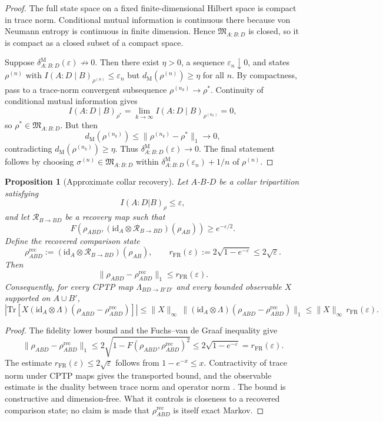 \documentclass[11pt]{article}
\newtheorem{proposition}[theorem]{Proposition}
\begin{document}
\begin{proof}
The full state space on a fixed finite-dimensional Hilbert space is compact in trace norm. Conditional mutual information is continuous there because von Neumann entropy is continuous in finite dimension. Hence \(\mathfrak M_{A:B:D}\) is closed, so it is compact as a closed subset of a compact space.

Suppose \(\delta^{\mathrm M}_{A:B:D}(\varepsilon)\not\to 0\). Then there exist \(\eta>0\), a sequence \(\varepsilon_n\downarrow 0\), and states \(\rho^{(n)}\) with \(I(A:D\mid B)_{\rho^{(n)}}\le \varepsilon_n\) but \(d_{\mathrm M}(\rho^{(n)})\ge \eta\) for all \(n\). By compactness, pass to a trace-norm convergent subsequence \(\rho^{(n_k)}\to \rho^\ast\). Continuity of conditional mutual information gives
\[
I(A:D\mid B)_{\rho^\ast}
=
\lim_{k\to\infty} I(A:D\mid B)_{\rho^{(n_k)}}
=
0,
\]
so \(\rho^\ast\in \mathfrak M_{A:B:D}\). But then
\[
d_{\mathrm M}(\rho^{(n_k)})
\le
\|\rho^{(n_k)}-\rho^\ast\|_1
\longrightarrow 0,
\]
contradicting \(d_{\mathrm M}(\rho^{(n_k)})\ge \eta\). Thus \(\delta^{\mathrm M}_{A:B:D}(\varepsilon)\to 0\). The final statement follows by choosing \(\sigma^{(n)}\in\mathfrak M_{A:B:D}\) within \(\delta^{\mathrm M}_{A:B:D}(\varepsilon_n)+1/n\) of \(\rho^{(n)}\).
\end{proof}

\begin{proposition}[Approximate collar recovery]\label{prop:approxrecover}
Let \(A\)-\(B\)-\(D\) be a collar tripartition satisfying
\[
I(A:D|B)_\rho\le \varepsilon,
\]
and let $\mathcal R_{B\to BD}$ be a recovery map such that
\[
F\!\left(\rho_{ABD},(\mathrm{id}_A\otimes \mathcal R_{B\to BD})(\rho_{AB})\right)\ge e^{-\varepsilon/2}.
\]
Define the recovered comparison state
\[
\rho^{\mathrm{rec}}_{ABD}:=(\mathrm{id}_A\otimes \mathcal R_{B\to BD})(\rho_{AB}),
\qquad
r_{\mathrm{FR}}(\varepsilon):=2\sqrt{1-e^{-\varepsilon}}\le 2\sqrt{\varepsilon}.
\]
Then
\[
\|\rho_{ABD}-\rho^{\mathrm{rec}}_{ABD}\|_1\le r_{\mathrm{FR}}(\varepsilon).
\]
Consequently, for every CPTP map \(\Lambda_{BD\to B'D'}\) and every bounded observable \(X\) supported on \(A\cup B'\),
\[
\left|\mathrm{Tr}\!\left[X(\mathrm{id}_A\otimes \Lambda)(\rho_{ABD}-\rho^{\mathrm{rec}}_{ABD})\right]\right|
\le
\|X\|_\infty\,\|(\mathrm{id}_A\otimes \Lambda)(\rho_{ABD}-\rho^{\mathrm{rec}}_{ABD})\|_1
\le
\|X\|_\infty\,r_{\mathrm{FR}}(\varepsilon).
\]
\end{proposition}

\begin{proof}
The fidelity lower bound and the Fuchs--van de Graaf inequality give
\[
\|\rho_{ABD}-\rho^{\mathrm{rec}}_{ABD}\|_1
\le
2\sqrt{1-F(\rho_{ABD},\rho^{\mathrm{rec}}_{ABD})^2}
\le
2\sqrt{1-e^{-\varepsilon}}
=
r_{\mathrm{FR}}(\varepsilon).
\]
The estimate \(r_{\mathrm{FR}}(\varepsilon)\le 2\sqrt{\varepsilon}\) follows from \(1-e^{-x}\le x\). Contractivity of trace norm under CPTP maps gives the transported bound, and the observable estimate is the duality between trace norm and operator norm \cite{fawziRenner15}. The bound is constructive and dimension-free. What it controls is closeness to a recovered comparison state; no claim is made that \(\rho^{\mathrm{rec}}_{ABD}\) is itself exact Markov.
\end{proof}
\end{document}
